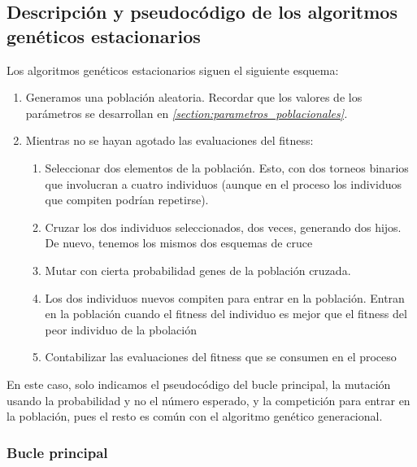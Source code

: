 \documentclass[11pt]{article}
\begin{document}
\pagebreak

\subsection{Descripción y pseudocódigo de los algoritmos genéticos estacionarios}

Los algoritmos genéticos estacionarios siguen el siguiente esquema:

\begin{enumerate}
    \item Generamos una población aleatoria. Recordar que los valores de los parámetros se desarrollan en \emph{\ref{section:parametros_poblacionales}. }
    \item Mientras no se hayan agotado las evaluaciones del fitness:
        \begin{enumerate}
            \item Seleccionar dos elementos de la población. Esto, con dos torneos binarios que involucran a cuatro individuos (aunque en el proceso los individuos que compiten podrían repetirse).
            \item Cruzar los dos individuos seleccionados, dos veces, generando dos hijos. De nuevo, tenemos los mismos dos esquemas de cruce
            \item Mutar con cierta probabilidad genes de la población cruzada.
            \item Los dos individuos nuevos compiten para entrar en la población. Entran en la población cuando el fitness del individuo es mejor que el fitness del peor individuo de la pbolación
            \item Contabilizar las evaluaciones del fitness que se consumen en el proceso
    \end{enumerate}
\end{enumerate}

En este caso, solo indicamos el pseudocódigo del bucle principal, la mutación usando la probabilidad y no el número esperado, y la competición para entrar en la población, pues el resto es común con el algoritmo genético generacional.

\subsubsection{Bucle principal}
\end{document}
